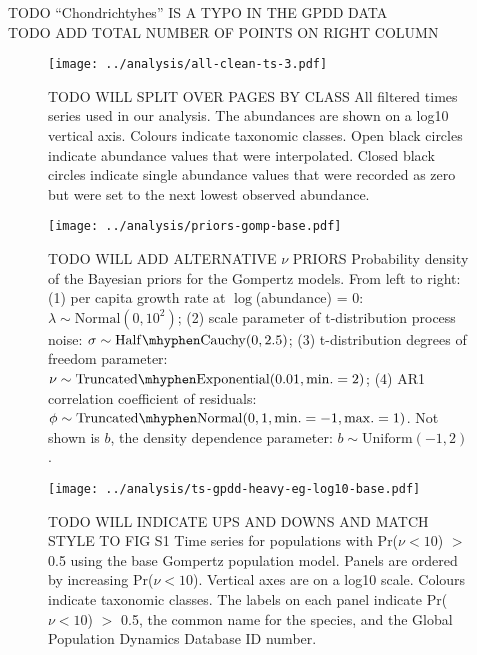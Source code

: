 
\clearpage
\renewcommand{\thetable}{S\arabic{table}}
\setcounter{table}{0}
TODO ``Chondrichtyhes'' IS A TYPO IN THE GPDD DATA\\
TODO ADD TOTAL NUMBER OF POINTS ON RIGHT COLUMN

\clearpage


\renewcommand{\thefigure}{S\arabic{figure}}
\setcounter{figure}{0}

\begin{figure}[htbp]
\begin{center}
\texttt{[image: ../analysis/all-clean-ts-3.pdf]}
\caption{
TODO WILL SPLIT OVER PAGES BY CLASS
  All filtered times series used in our analysis. The abundances are shown on
  a log10 vertical axis. Colours indicate taxonomic classes. Open black circles
  indicate abundance values that were interpolated. Closed black circles
  indicate single abundance values that were recorded as zero but were set to
  the next lowest observed abundance.
}
    \label{fig:all-ts}
\end{center}
\end{figure}

\clearpage

\begin{figure}[htbp]
\begin{center}
\texttt{[image: ../analysis/priors-gomp-base.pdf]}
\caption{
TODO WILL ADD ALTERNATIVE $\nu$ PRIORS
  Probability density of the Bayesian priors for the Gompertz models. From left
  to right: (1) per capita growth rate at $\log$(abundance) = $0$: $\lambda \sim
  \mathrm{Normal}(0, 10^2)$; (2) scale parameter of t-distribution process
  noise: $\sigma \sim \mathrm{Half\mhyphen Cauchy} (0,
  2.5)$; (3) t-distribution degrees of freedom parameter: $\nu \sim
  \mathrm{Truncated\mhyphen Exponential}(0.01, \mathrm{min.} = 2)$; (4) AR1
  correlation coefficient of residuals: $\phi \sim \mathrm{Truncated \mhyphen
    Normal}(0, 1, \mathrm{min.} = -1, \mathrm{max.} = 1)$. Not shown is $b$,
  the density dependence parameter: $b \sim \mathrm{Uniform}(-1, 2)$.
}
  \label{fig:priors}
\end{center}
\end{figure}

\clearpage

\begin{figure}[htbp]
\begin{center}
\texttt{[image: ../analysis/ts-gpdd-heavy-eg-log10-base.pdf]}
\caption{
TODO WILL INDICATE UPS AND DOWNS AND MATCH STYLE TO FIG S1
  Time series for populations with Pr($\nu < 10$) $>$ 0.5 using the base
  Gompertz population model. Panels are ordered by increasing Pr($\nu < 10$).
  Vertical axes are on a log10 scale. Colours indicate taxonomic classes. The
  labels on each panel indicate Pr($\nu < 10$) $>$ 0.5, the common name for the
  species, and the Global Population Dynamics Database ID number.
}
\label{fig:heavy-ts}
\end{center}
\end{figure}


